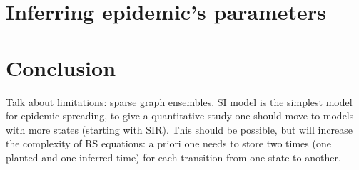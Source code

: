\documentclass[a4paper, amsfonts, amssymb, amsmath, reprint, showkeys, nofootinbib, twoside, floatfix, pre,superscriptaddress]{revtex4-2}
\begin{document}
\section{Inferring epidemic's parameters}


\section{Conclusion}

Talk about limitations: sparse graph ensembles. SI model is the simplest model for epidemic spreading, to give a quantitative study one should move to models with more states (starting with SIR). This should be possible, but will increase the complexity of RS equations: a priori one needs to store two times (one planted and one inferred time) for each transition from one state to another.



\end{document}
